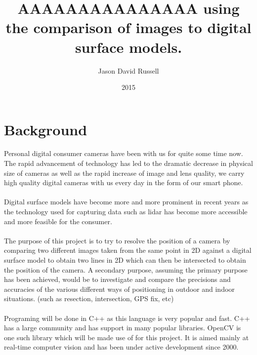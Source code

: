 \documentclass{article}
\title{AAAAAAAAAAAAAAA using the comparison of images to digital surface models.}
\date{2015}
\author{Jason David Russell}
\begin{document}
\maketitle
{}

\newpage
\tableofcontents

\newpage
{}

\section{Background}
\paragraph{}
Personal digital consumer cameras have been with us for quite some time now. The rapid advancement of technology has led to the dramatic decrease in physical size of cameras as well as the rapid increase of image and lens quality, we carry high quality digital cameras with us every day in the form of our smart phone.

\paragraph{}
Digital surface models have become more and more prominent in recent years as the technology used for capturing data such as lidar has become more accessible and more feasible for the consumer. 

\paragraph{}
The purpose of this project is to try to resolve the position of a camera by comparing two different images taken from the same point in 2D against a digital surface model to obtain two lines in 2D which can then be intersected to obtain the position of the camera. A secondary purpose, assuming the primary purpose has been achieved, would be to investigate and compare the precisions and accuracies of the various different ways of positioning in outdoor and indoor situations. (such as resection, intersection, GPS fix, etc)

\paragraph{}
Programing will be done in C++ as this language is very popular and fast. C++ has a large community and has support in many popular libraries. OpenCV is one such library which will be made use of for this project. It is aimed mainly at real-time computer vision and has been under active development since 2000. 
\end{document}
